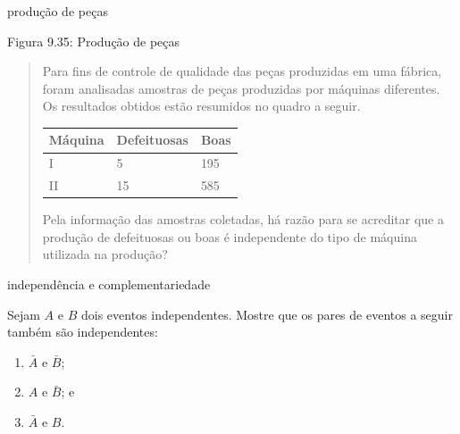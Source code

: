 \begin{task}{produção de peças}
\label{ativ-producao-de-pecas}

\label{\detokenize{PE511-8:id1}}
\begin{figure}[H]
\centering

\noindent{}
\label{\detokenize{PE511-8:id1}}\end{figure}

Figura 9.35: Produção de peças
\begin{quote}

Para fins de controle de qualidade das peças produzidas em uma fábrica, foram analisadas amostras de peças produzidas por máquinas diferentes. Os resultados obtidos estão resumidos no quadro a seguir.


\begin{savenotes}\sphinxattablestart
\centering
\begin{tabulary}{\linewidth}[t]{|T|T|T|}
\hline

Máquina
&
Defeituosas
&
Boas
\\
\hline
I
&
5
&
195
\\
\hline
II
&
15
&
585
\\
\hline
\end{tabulary}
\par
\sphinxattableend\end{savenotes}

Pela informação das amostras coletadas, há razão para se acreditar que a produção de defeituosas ou boas é independente do tipo de máquina utilizada na produção?
\end{quote}
\end{task}

\begin{task}{independência e complementariedade}
\label{ativ-independencia-e-complementaridade}

Sejam \(A\) e \(B\) dois eventos independentes.  Mostre que os pares de eventos a seguir também são independentes:
\begin{enumerate}
\item {} 
\(\bar{A}\) e \(\bar{B}\);

\item {} 
\(A\) e \(\bar{B}\); e

\item {} 
\(\bar{A}\) e \(B\).

\end{enumerate}
\end{task}

